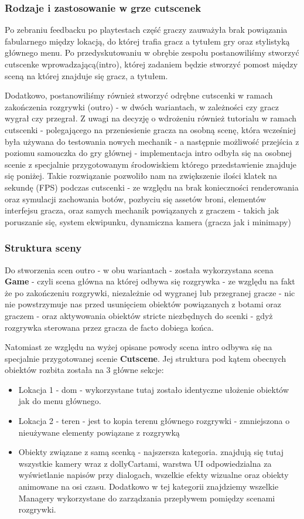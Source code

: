 \subsubsection{Rodzaje i zastosowanie  w grze cutscenek}
Po zebraniu feedbacku po playtestach część graczy zauważyła brak powiązania fabularnego między lokacją, do której trafia gracz a tytułem gry oraz stylistyką głównego menu.
Po przedyskutowaniu w obrębie zespołu postanowiliśmy stworzyć cutscenke wprowadzającą(intro), której zadaniem będzie stworzyć pomost między sceną na której znajduje się gracz, a tytułem.

Dodatkowo, postanowiliśmy również stworzyć odrębne cutscenki w ramach zakończenia rozgrywki (outro) - w dwóch wariantach,
w zależności czy gracz wygrał czy przegrał.
Z uwagi na decyzję o wdrożeniu również tutorialu w ramach cutscenki - polegającego na przeniesienie gracza na osobną scenę, która wcześniej była używana do testowania nowych mechanik - a następnie możliwość przejścia z poziomu samouczka do gry głównej - implementacja intro odbyła się na osobnej scenie z specjalnie przygotowanym środowiskiem którego przedstawienie znajduje się poniżej.
Takie rozwiązanie pozwoliło nam na zwiększenie ilości klatek na sekundę (FPS) podczas cutscenki - ze względu na brak konieczności renderowania oraz symulacji zachowania botów, pozbyciu się assetów broni, elementów interfejsu gracza, oraz samych mechanik powiązanych z graczem - takich jak poruszanie się, system ekwipunku, dynamiczna kamera (gracza jak i minimapy)

\subsubsection{Struktura sceny}
Do stworzenia scen outro - w obu wariantach - została wykorzystana scena \textbf{Game} - czyli scena główna na której odbywa się rozgrywka - ze względu na fakt że po zakończeniu rozgrywki, niezależnie od wygranej lub przegranej gracze - nic nie powstrzymuje nas przed usunięciem obiektów powiązanych z botami oraz graczem - oraz aktywowania obiektów stricte niezbędnych do scenki - gdyż rozgrywka sterowana przez gracza de facto dobiega końca.

Natomiast ze względu na wyżej opisane powody scena intro odbywa się na specjalnie przygotowanej scenie \textbf{Cutscene}.
Jej struktura pod kątem obecnych obiektów rozbita została na 3 główne sekcje:
\begin{itemize}
    \item Lokacja 1 - dom - wykorzystane tutaj zostało identyczne ułożenie obiektów jak do menu głównego.
    \item Lokacja 2 - teren - jest to kopia terenu głównego rozgrywki - zmniejszona o nieużywane elementy powiązane z rozgrywką
    \item Obiekty związane z samą scenką - najszersza kategoria. znajdują się tutaj wszystkie kamery wraz z dollyCartami,
    warstwa UI odpowiedzialna za wyświetlanie napisów przy dialogach, wszelkie efekty wizualne oraz obiekty animowane na osi czasu.
    Dodatkowo w tej kategorii znajdziemy wszelkie Managery wykorzystane do zarządzania przepływem pomiędzy scenami rozgrywki.
\end{itemize}

